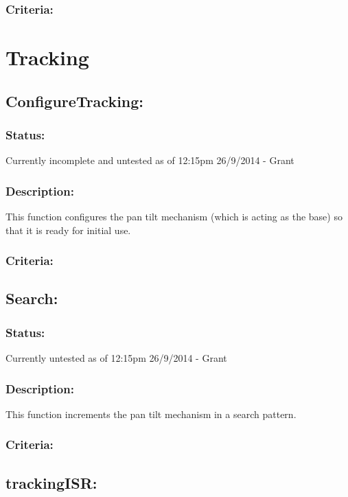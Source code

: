 \documentclass[]{report}
\begin{document}
\subsubsection{Criteria:}

\newpage
\section{Tracking}

\subsection{ConfigureTracking:}
\subsubsection{Status:}
Currently incomplete and untested as of 12:15pm 26/9/2014 - Grant

\subsubsection{Description:}
This function configures the pan tilt mechanism (which is acting as the base) so that it is ready for initial use.

\subsubsection{Criteria:}

\subsection{Search:}
\subsubsection{Status:}
Currently untested as of 12:15pm 26/9/2014 - Grant

\subsubsection{Description:}
This function increments the pan tilt mechanism in a search pattern.

\subsubsection{Criteria:}

\subsection{trackingISR:}
\end{document}
